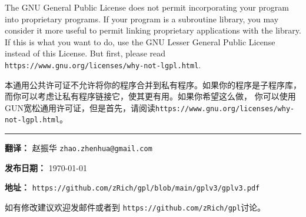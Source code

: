 \documentclass[11pt]{article}
\begin{document}
\begin{enumerate}
        The GNU General Public License does not permit incorporating your
        program into proprietary programs.  If your program is a subroutine
        library, you may consider it more useful to permit linking proprietary
        applications with the library.  If this is what you want to do, use
        the GNU Lesser General Public License instead of this License.  But
        first, please read \texttt{https://www.gnu.org/licenses/why-not-lgpl.html}.

        本通用公共许可证不允许将你的程序合并到私有程序。如果你的程序是子程序库，而你可以考虑让私有程序链接它，使其更有用。如果你希望这么做，
        你可以使用GUN宽松通用许可证，但是首先，请阅读\texttt{https://www.gnu.org/licenses/why-not-lgpl.html}。

\end{enumerate}

\vfill

\noindent\rule{\textwidth}{0.4pt}

\textbf{翻译：} 赵振华 \texttt{zhao.zhenhua@gmail.com}

\textbf{发布日期：} \today

\textbf{地址：} \texttt{https://github.com/zRich/gpl/blob/main/gplv3/gplv3.pdf}

如有修改建议欢迎发邮件或者到 \texttt{https://github.com/zRich/gpl}讨论。
\end{document}
